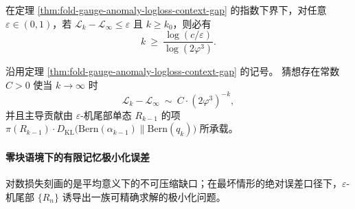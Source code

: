 \begin{corollary}[达到指定误差阈值所需的上下文深度]\label{cor:fold-gauge-anomaly-logloss-context-depth}
在定理 \ref{thm:fold-gauge-anomaly-logloss-context-gap} 的指数下界下，对任意 \(\varepsilon\in(0,1)\)，若 \(\mathcal L_k-\mathcal L_\infty\le \varepsilon\) 且 \(k\ge k_0\)，则必有
\[
k\ \ge\ \frac{\log(c/\varepsilon)}{\log(2\varphi^3)}.
\]
\end{corollary}

\begin{conjecture}[对数损失缺口的精确指数率与主导项]\label{conj:fold-gauge-anomaly-logloss-gap-asymptotic}
沿用定理 \ref{thm:fold-gauge-anomaly-logloss-context-gap} 的记号。
猜想存在常数 \(C>0\) 使当 \(k\to\infty\) 时
\[
\mathcal L_k-\mathcal L_\infty\ \sim\ C\cdot (2\varphi^3)^{-k},
\]
并且主导贡献由 \(\varepsilon\)-机尾部单态 \(R_{k-1}\) 的项
\(
\pi(R_{k-1})\cdot D_{\mathrm{KL}}\bigl(\mathrm{Bern}(\alpha_{k-1})\|\mathrm{Bern}(q_k)\bigr)
\)
所承载。
\end{conjecture}

\paragraph{零块语境下的有限记忆极小化误差}
对数损失刻画的是平均意义下的不可压缩缺口；在最坏情形的绝对误差口径下，\(\varepsilon\)-机尾部 \(\{R_n\}\) 诱导出一族可精确求解的极小化问题。

